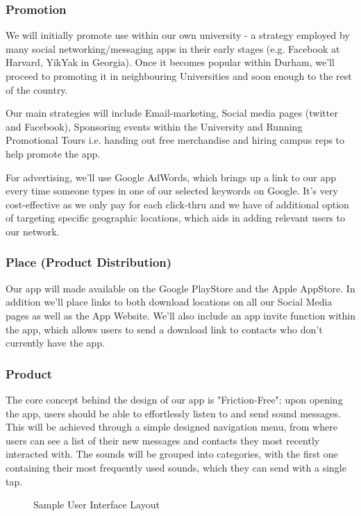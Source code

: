 \documentclass[12pt]{article}
\begin{document}
\subsubsection*{Promotion}
We will initially promote use within our own university - a strategy employed by many social networking/messaging apps in their early stages (e.g. Facebook at Harvard, YikYak in Georgia). Once it becomes popular within Durham, we'll proceed to promoting it in neighbouring Universities and soon enough to the rest of the country.
 
Our main strategies will include  Email-marketing, Social media pages (twitter and Facebook), Sponsoring events within the University and Running Promotional Tours i.e. handing out free merchandise and hiring campus reps to help promote the app.
 
For advertising, we'll use Google AdWords, which brings up a link to our app every time someone types in one of our selected keywords on Google. It's very cost-effective as we only pay for each click-thru and we have of additional option of targeting specific geographic locations, which aids in adding relevant users to our network.

\subsubsection*{Place (Product Distribution)}
Our app will made available on the Google PlayStore and the Apple AppStore. In addition we'll place links to both download locations on all our Social Media pages as well as the App Website. We'll also include an app invite function within the app, which allows users to send a download link to contacts who don't currently have the app.

\subsubsection*{Product}
The core concept behind the design of our app is "Friction-Free": upon opening the app, users should be able to effortlessly listen to and send sound messages. This will be achieved through a simple designed navigation menu, from where users can see a list of their new messages and contacts they most recently interacted with. The sounds will be grouped into categories, with the first one containing their most frequently used sounds, which they can send with a single tap.

\begin{figure}[!h]
    \centering
    \caption{Sample User Interface Layout}
    \label{fig:ui}
\end{figure}
\end{document}
